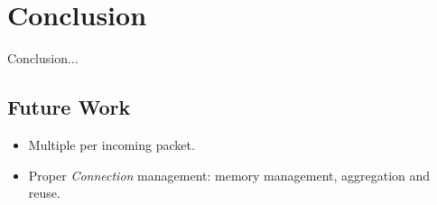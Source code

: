 \chapter{Conclusion}
\label{cap:conclusion}



Conclusion...

\section{Future Work}


\begin{itemize}
    \item Multiple \Offloaders{} per incoming packet.
    \item Proper \textit{Connection} management: memory management, aggregation and reuse.
\end{itemize}
